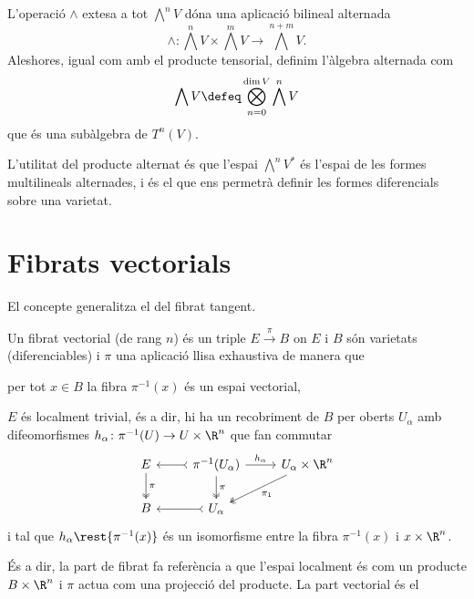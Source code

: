 \documentclass[12pt,twocolumn]{article}
\begin{document}
L'operació \( \wedge \) extesa a tot \( \bigwedge^n V \) dóna una aplicació bilineal alternada 
\begin{equation*}
	\wedge \colon \bigwedge^n V \times \bigwedge^mV \to \bigwedge^{n+m}V.
\end{equation*}
Aleshores, igual com amb el producte tensorial, definim l'àlgebra alternada com
\begin{equation*}
	\bigwedge V \defeq \bigotimes_{n = 0}^{\dim V} \bigwedge^n V
\end{equation*}
que és una subàlgebra de \( T^n(V) \). 

L'utilitat del producte alternat és que l'espai \( \bigwedge^n V^\ast \) és l'espai de les formes
multilineals alternades, i és el que ens permetrà definir les formes diferencials sobre una
varietat. 

\section{Fibrats vectorials}
El concepte generalitza el del fibrat tangent. 
\begin{definition}
	Un fibrat vectorial (de rang \( n \)) és un triple \( E \xrightarrow{\pi} B \) on \( E
	\) i \( B \) són varietats (diferenciables) i \( \pi \) una aplicació llisa exhaustiva
	de manera que
	\begin{points}
	\item per tot \( x \in B \) la fibra \( \pi^{-1}(x) \) és un espai vectorial,
	\item \( E \) és localment trivial, és a dir, hi ha un recobriment de \( B \) per oberts
		\( U_\alpha \) amb difeomorfismes \( h_\alpha \colon \pi^{-1}(U) \to U \times \R^n \)
		que fan commutar
		\begin{equation*}
			\begin{tikzcd}
				E \arrow[d, two heads, "\pi"] & \arrow[l, tail] \arrow[d, two heads, "\pi"]
				\pi^{-1}(U_\alpha) \arrow[r, "h_\alpha"] & U_\alpha \times \R^n \arrow[dl, two heads, "\pi_1"] \\
				B & \arrow[l, tail] U_\alpha
			\end{tikzcd}
		\end{equation*}
		i tal que \( h_\alpha \rest{\pi^{-1}(x)} \) és un isomorfisme entre la fibra \(
		\pi^{-1}(x) \) i \( x \times \R^{n} \). 
	\end{points}
\end{definition}
És a dir, la part de fibrat fa referència a que l'espai localment és com un producte \( B
\times \R^n \) i \( \pi \) actua com una projecció del producte. La part vectorial és el
\end{document}
